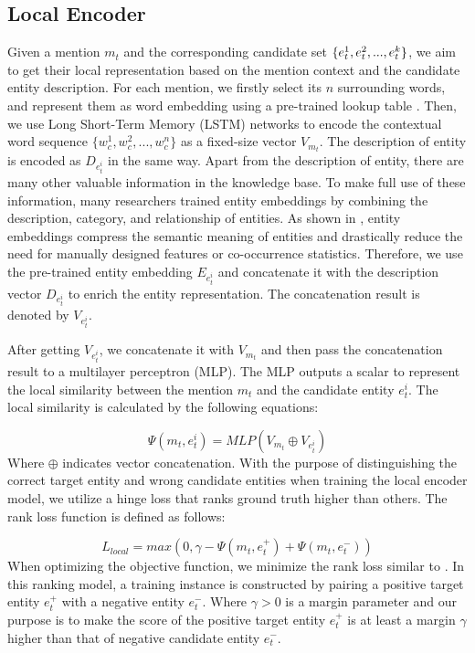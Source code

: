 \documentclass[sigconf]{acmart}
\begin{document}
\subsection{Local Encoder}
Given a mention $m_t$ and the corresponding candidate set $\{e_t^1, e_t^2,..., \\ e_t^k\}$, we aim to get their local representation based on the mention context and the candidate entity description. For each mention, we firstly select its $n$ surrounding words, and represent them as word embedding using a pre-trained lookup table \cite{abs-1301-3781}. Then, we use Long Short-Term Memory (LSTM) networks to encode the contextual word sequence $\{w_c^1, w_c^2,..., w_c^n\}$ as a fixed-size vector $V_{m_t}$. The description of entity is encoded as $D_{e_t^i}$ in the same way. Apart from the description of entity, there are many other valuable information in the knowledge base. To make full use of these information, many researchers trained entity embeddings by combining the description, category, and relationship of entities. As shown in \cite{GaneaH17}, entity embeddings compress the semantic meaning of entities and drastically reduce the need for manually designed features or co-occurrence statistics. Therefore, we use the pre-trained entity embedding $E_{e_t^i}$ and concatenate it with the description vector $D_{e_t^i}$ to enrich the entity representation. The concatenation result is denoted by $V_{e_t^i}$.

After getting $V_{e_t^i}$, we concatenate it with $V_{m_t}$ and then pass the concatenation result to a multilayer perceptron (MLP). The MLP outputs a scalar to represent the local similarity between the mention $m_t$ and the candidate entity $e_t^i$. The local similarity is calculated by the following equations:

\begin{equation} 
\Psi(m_t, e_t^i) = MLP(V_{m_t}\oplus{V_{e_t^i}})
\end{equation}
Where $\oplus$ indicates vector concatenation. With the purpose of distinguishing the correct target entity and wrong candidate entities when training the local encoder model, we utilize a hinge loss that ranks ground truth higher than others. The rank loss function is defined as follows:

\begin{equation}       
L_{local} = max(0, \gamma-\Psi(m_t, e_t^+)+\Psi(m_t, e_t^-))
\end{equation}
When optimizing the objective function, we minimize the rank loss similar to \cite{GaneaH17, TitovL18a}. In this ranking model, a training instance is constructed by pairing a positive target entity $e_t^+$ with a negative entity $e_t^-$. Where $\gamma > 0$ is a margin parameter and our purpose is to make the score of the positive target entity $e_t^+$ is at least a margin $\gamma$ higher than that of negative candidate entity $e_t^-$.
\end{document}
